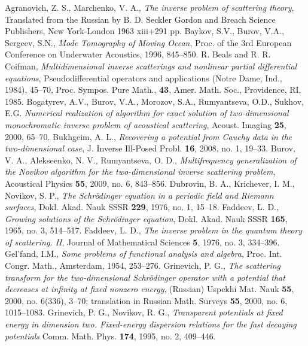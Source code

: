 \documentclass[11pt,a4paper,english,subeqn]{amsart}
\theoremstyle{plain}
\theoremstyle{definition}
\numberwithin{equation}{section}
\begin{document}
\begin{thebibliography}{99}
 Agranovich, Z. S., Marchenko, V. A., \textit{The inverse problem of scattering theory}, Translated from the Russian by B. D. Seckler Gordon and Breach Science Publishers, New York-London 1963 xiii+291 pp.
 Baykov, S.V., Burov, V.A., Sergeev, S.N., \textit{Mode Tomography of Moving Ocean}, Proc. of the 3rd European Conference on Underwater Acoustics, 1996, 845--850.
 R. Beals and R. R. Coifman, \textit{Multidimensional inverse scatterings and nonlinear partial differential equations}, Pseudodifferential operators and applications (Notre Dame, Ind., 1984), 45--70, Proc. Sympos. Pure Math., \textbf{43}, Amer. Math. Soc., Providence, RI, 1985.
 Bogatyrev, A.V., Burov, V.A., Morozov, S.A., Rumyantseva, O.D., Sukhov, E.G. \textit{Numerical realization of algorithm for exact solution of two-dimensional monochromatic inverse problem of acoustical scattering}, Acoust. Imaging \textbf{25}, 2000, 65--70.
 Bukhgeim, A. L., \textit{Recovering a potential from Cauchy data in the two-dimensional case}, J. Inverse Ill-Posed Probl. \textbf{16}, 2008,  no. 1, 19--33.
 Burov, V. A., Alekseenko, N. V., Rumyantseva, O. D., \textit{Multifrequency generalization of the Novikov algorithm for the two-dimensional inverse scattering problem}, Acoustical Physics \textbf{55}, 2009, no. 6, 843--856.
 Dubrovin, B. A., Krichever, I. M., Novikov, S. P., \textit{The Schr\"odinger equation in a periodic field and Riemann surfaces}, Dokl. Akad. Nauk SSSR \textbf{229}, 1976, no. 1, 15--18.
 Faddeev, L. D., \textit{Growing solutions of the Schr\"odinger equation}, Dokl. Akad. Nauk SSSR \textbf{165}, 1965, no. 3, 514--517.
 Faddeev, L. D., \textit{The inverse problem in the quantum theory of scattering. II}, Journal of Mathematical Sciences \textbf{5}, 1976, no. 3, 334--396.
 Gel'fand, I.M., \textit{Some problems of functional analysis and algebra}, Proc. Int. Congr. Math., Amsterdam, 1954, 253--276.
 Grinevich, P. G., \textit{The scattering transform for the two-dimensional Schr\"odinger operator with a potential that decreases at infinity at fixed nonzero energy}, (Russian) Uspekhi Mat. Nauk \textbf{55}, 2000, no. 6(336), 3--70; translation in Russian Math. Surveys \textbf{55}, 2000, no. 6, 1015--1083.
 Grinevich, P. G., Novikov, R. G., \textit{Transparent potentials at fixed energy in dimension two. Fixed-energy dispersion relations for the fast decaying potentials}  Comm. Math. Phys.  \textbf{174}, 1995,  no. 2, 409--446.

\end{thebibliography}
\end{document}
